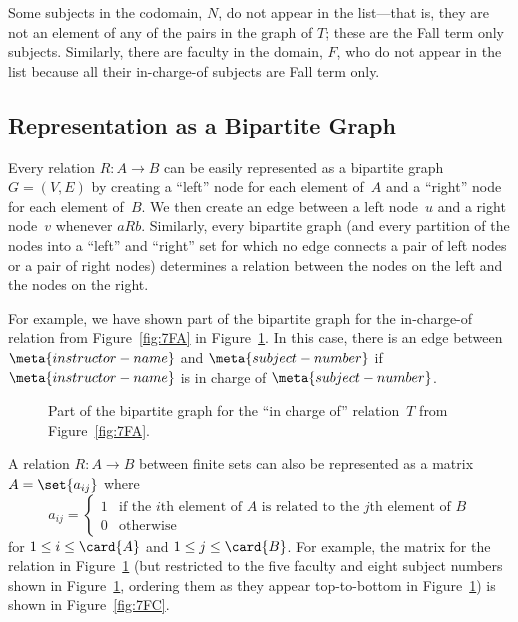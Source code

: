 Some subjects in the codomain, $N$, do not appear in the list---that
is, they are not an element of any of the pairs in the graph of $T$;
these are the Fall term only subjects.  Similarly, there are faculty
in the domain, $F$, who do not appear in the list because all their
in-charge-of subjects are Fall term only.

\subsection{Representation as a Bipartite Graph}

Every relation $R: A \to B$ can be easily represented as a bipartite
graph $G = (V, E)$ by creating a ``left'' node for each element of~$A$
and a ``right'' node for each element of~$B$.  We then create an edge
between a left node~$u$ and a right node~$v$ whenever $a R b$.
Similarly, every bipartite graph (and every partition of the nodes
into a ``left'' and ``right'' set for which no edge connects a pair of
left nodes or a pair of right nodes) determines a relation between the
nodes on the left and the nodes on the right.

For example, we have shown part of the bipartite graph for the
in-charge-of relation from Figure~\ref{fig:7FA} in
Figure~\ref{fig:7FB}.  In this case, there is an edge between
$\meta{instructor-name}$ and $\meta{subject-number}$ if
$\meta{instructor-name}$ is in charge of $\meta{subject-number}$.

\begin{figure}


\caption{Part of the bipartite graph for the ``in charge of''
  relation~$T$ from Figure~\ref{fig:7FA}.}

\label{fig:7FB}

\end{figure}

A relation $R: A \to B$ between finite sets can also be represented as
a matrix $A = \set{a_{ij}}$ where
\begin{equation*}
    a_{ij} = \begin{cases}
                1 & \text{if the $i$th element of~$A$ is related to
                          the $j$th element of~$B$} \\
                0 & \text{otherwise}
             \end{cases}
\end{equation*}
for $1 \le i \le \card{A}$ and $1 \le j \le \card{B}$.  For example,
the matrix for the relation in Figure~\ref{fig:7FB} (but restricted to
the five faculty and eight subject numbers shown in
Figure~\ref{fig:7FB}, ordering them as they appear top-to-bottom in
Figure~\ref{fig:7FB}) is shown in Figure~\ref{fig:7FC}.


